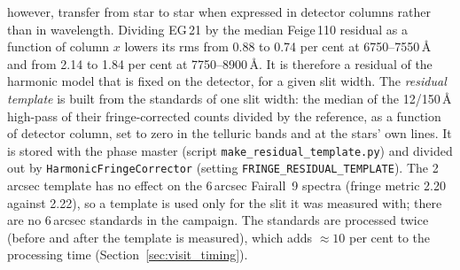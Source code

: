 \begin{enumerate}
however, transfer from star to star when expressed in detector columns rather than in wavelength. Dividing EG\,21 by
the median Feige\,110 residual as a function of column $x$ lowers its rms from 0.88 to 0.74 per cent at
6750--7550\,\AA{} and from 2.14 to 1.84 per cent at 7750--8900\,\AA. It is therefore a residual of the harmonic model
that is fixed on the detector, for a given slit width. The \emph{residual template} is built from the standards of
one slit width: the median of the 12/150\,\AA{} high-pass of their fringe-corrected counts divided by the reference,
as a function of detector column, set to zero in the telluric bands and at the stars' own lines. It is stored with the
phase master (script \texttt{make\_residual\_template.py}) and divided out by \texttt{HarmonicFringeCorrector}
(setting \texttt{FRINGE\_RESIDUAL\_TEMPLATE}). The 2\,arcsec template has no effect on the 6\,arcsec Fairall~9
spectra (fringe metric 2.20 against 2.22), so a template is used only for the slit it was measured with; there are no
6\,arcsec standards in the campaign. The standards are processed twice (before and after the template is measured),
which adds $\approx10$ per cent to the processing time (Section~\ref{sec:visit_timing}).
\end{enumerate}

